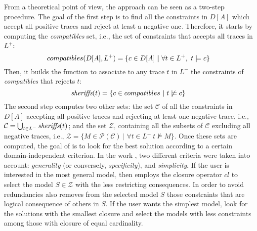 From a theoretical point of view, the \nd approach can be seen as a two-step procedure. %
The goal of the first step is to find all the constraints in $D[A]$ which accept all positive traces and reject at least a negative one. Therefore, it starts by computing the \emph{compatibles} set, i.e., the set of constraints that accepts all traces in $L^+$: 
\begin{equation}
{compatibles(D[A], L^+)} = \{c\in D[A]~|~\forall t\in L^+,~ t\models c \} \\
\end{equation}
%
Then, it builds the \textit{\sheriff} function to associate to any trace $t$ in $L^-$ the constraints of \textit{compatibles} that rejects $t$:
\begin{equation}
{\textit{sheriffs}}(t) = \{c\in {compatibles}~|~t\not\models c\} \\
\end{equation}
%
The second step computes two other sets: the set $\mathcal{C}$ of all the constraints in $D[A]$ accepting all positive traces and rejecting at least one negative trace, i.e., $\mathcal{C} = \bigcup_{t\in L^-} \textit{sheriffs}(t)$; and the set $\mathcal{Z}$, containing all the subsets of $\mathcal{C}$ excluding all negative traces, i.e., $\mathcal{Z}=\{M\in\mathcal{P}(\mathcal{C})\mid \forall t\in L^-~t\not\models M \} $.
Once these sets are computed, the goal of \nd is to look for the best solution according to a certain domain-independent criterion. 
In the work \cite{deviant-tkde}, two different criteria were taken into account: \emph{generality} (or conversely, \emph{specificity}), and \emph{simplicity}.
If the user is interested in the most general model, then \nd employs the closure operator $cl$ to select the model $S \in \mathcal{Z}$ with the less restricting consequences. In order to avoid redundancies \nd also removes from the selected model $S$ those constraints that are logical consequence of others in $S$.
If the user wants the simplest model, \nd look for the solutions with the smallest closure and select the models with less constraints among those with closure of equal cardinality.



